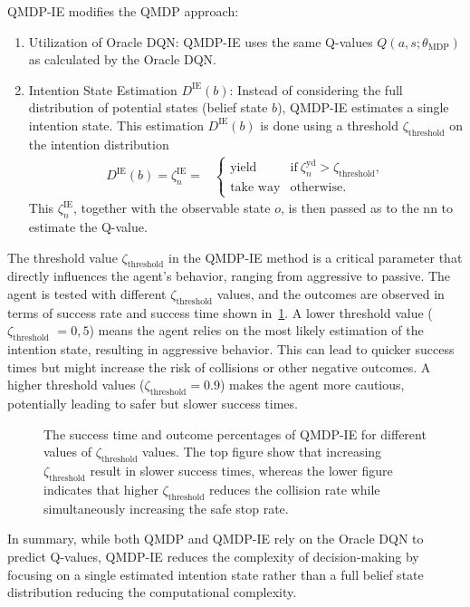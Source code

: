 QMDP-IE modifies the QMDP approach:
\begin{enumerate}
	\item Utilization of Oracle DQN: QMDP-IE uses the same Q-values $Q(a,s;\theta_\mathrm{MDP})$ as calculated by the Oracle DQN.
	\item Intention State Estimation $D^\mathrm{IE}(b)$: Instead of considering the full distribution of potential states (belief state $b$), QMDP-IE estimates a single intention state. This estimation $D^\mathrm{IE}(b)$ is done using a threshold $\zeta_\mathrm{threshold}$ on the intention distribution
	\begin{align}
		D^\mathrm{IE}(b) = \zeta^\mathrm{IE}_n = & \begin{cases}
		\text{yield} & \text{if} \ \zeta_n^\text{yd} > \zeta_\text{threshold},\\
		\text{take way} & \text{otherwise.}
		\label{eq:IE_i}
		\end{cases} 
	\end{align}
	This $\zeta^\mathrm{IE}_n$, together with the observable state $o$, is then passed as to the \gls{nn} to estimate the Q-value.
\end{enumerate}
The threshold value $\zeta_\mathrm{threshold}$ in the QMDP-IE method is a critical parameter that directly influences the agent's behavior, ranging from aggressive to passive. The agent is tested with different $\zeta_\mathrm{threshold}$ values, and the outcomes are observed in terms of success rate and success time shown in~\ref{fig:thesis_intent_threshold}.
A lower threshold value ($\zeta_\mathrm{threshold}$ $= 0,5$) means the agent relies on the most likely estimation of the intention state, resulting in aggressive behavior. This can lead to quicker success times but might increase the risk of collisions or other negative outcomes. A higher threshold values ($\zeta_\mathrm{threshold}=0.9$) makes the agent more cautious, potentially leading to safer but slower success times.
\begin{figure}[ht]
	\centering
			
			\vspace{-0.8cm}
			\caption{The success time and outcome percentages of QMDP-IE for different values of  $\zeta_\mathrm{threshold}$ values. The top figure show that increasing $\zeta_\mathrm{threshold}$ result in slower success times, whereas the lower figure indicates that higher $\zeta_\mathrm{threshold}$ reduces the collision rate while simultaneously increasing the safe stop rate.}
	\label{fig:thesis_intent_threshold}
\end{figure}
In summary, while both QMDP and QMDP-IE rely on the Oracle DQN to predict Q-values, QMDP-IE reduces the complexity of decision-making by focusing on a single estimated intention state rather than a full belief state distribution reducing the computational complexity.


